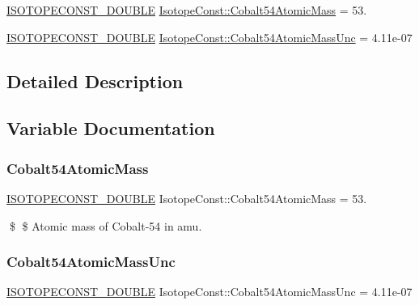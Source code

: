 \begin{DoxyCompactItemize}
\item 
\mbox{\hyperlink{group___isotope_const-_macros_ga8f45a7272ce02c0b4c65c44636ed719a}{I\+S\+O\+T\+O\+P\+E\+C\+O\+N\+S\+T\+\_\+\+D\+O\+U\+B\+LE}} \mbox{\hyperlink{group___isotope_const-_cobalt-_co54_ga21b3eafe28bb59ee1e4cb790cf6c36ec}{Isotope\+Const\+::\+Cobalt54\+Atomic\+Mass}} = 53.
\item 
\mbox{\hyperlink{group___isotope_const-_macros_ga8f45a7272ce02c0b4c65c44636ed719a}{I\+S\+O\+T\+O\+P\+E\+C\+O\+N\+S\+T\+\_\+\+D\+O\+U\+B\+LE}} \mbox{\hyperlink{group___isotope_const-_cobalt-_co54_ga94563807802bad33853e1bb07b66d438}{Isotope\+Const\+::\+Cobalt54\+Atomic\+Mass\+Unc}} = 4.\+11e-\/07
\end{DoxyCompactItemize}


\subsection{Detailed Description}


\subsection{Variable Documentation}
\mbox{\label{group___isotope_const-_cobalt-_co54_ga21b3eafe28bb59ee1e4cb790cf6c36ec}} 
\subsubsection{\texorpdfstring{Cobalt54\+Atomic\+Mass}{Cobalt54AtomicMass}}
{\footnotesize\ttfamily \mbox{\hyperlink{group___isotope_const-_macros_ga8f45a7272ce02c0b4c65c44636ed719a}{I\+S\+O\+T\+O\+P\+E\+C\+O\+N\+S\+T\+\_\+\+D\+O\+U\+B\+LE}} Isotope\+Const\+::\+Cobalt54\+Atomic\+Mass = 53.}

\$ \$ Atomic mass of Cobalt-\/54 in amu. \mbox{\label{group___isotope_const-_cobalt-_co54_ga94563807802bad33853e1bb07b66d438}} 
\subsubsection{\texorpdfstring{Cobalt54\+Atomic\+Mass\+Unc}{Cobalt54AtomicMassUnc}}
{\footnotesize\ttfamily \mbox{\hyperlink{group___isotope_const-_macros_ga8f45a7272ce02c0b4c65c44636ed719a}{I\+S\+O\+T\+O\+P\+E\+C\+O\+N\+S\+T\+\_\+\+D\+O\+U\+B\+LE}} Isotope\+Const\+::\+Cobalt54\+Atomic\+Mass\+Unc = 4.\+11e-\/07}

